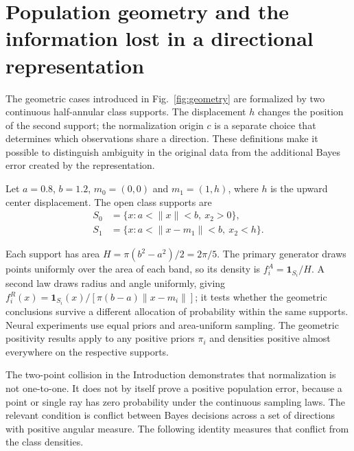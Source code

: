 \section{Population geometry and the information lost in a directional representation}
\label{sec:origin-theory}

The geometric cases introduced in Fig.~\ref{fig:geometry} are formalized by two continuous half-annular class supports. The displacement $h$ changes the position of the second support; the normalization origin $c$ is a separate choice that determines which observations share a direction. These definitions make it possible to distinguish ambiguity in the original data from the additional Bayes error created by the representation.

\begin{samepage}
Let $a=0.8$, $b=1.2$, $m_0=(0,0)$ and $m_1=(1,h)$, where $h$ is the upward center displacement. The open class supports are
\begin{align}
 S_0&=\{x:a<\|x\|<b,\ x_2>0\},\nonumber\\
 S_1&=\{x:a<\|x-m_1\|<b,\ x_2<h\}.
 \label{eq:halfmoon-supports}
\end{align}
\end{samepage}
Each support has area $H=\pi(b^2-a^2)/2=2\pi/5$. The primary generator draws points uniformly over the area of each band, so its density is $f_i^A=\mathbf1_{S_i}/H$. A second law draws radius and angle uniformly, giving $f_i^R(x)=\mathbf1_{S_i}(x)/[\pi(b-a)\|x-m_i\|]$; it tests whether the geometric conclusions survive a different allocation of probability within the same supports. Neural experiments use equal priors and area-uniform sampling. The geometric positivity results apply to any positive priors $\pi_i$ and densities positive almost everywhere on the respective supports.

The two-point collision in the Introduction demonstrates that normalization is not one-to-one. It does not by itself prove a positive population error, because a point or single ray has zero probability under the continuous sampling laws. The relevant condition is conflict between Bayes decisions across a set of directions with positive angular measure. The following identity measures that conflict from the class densities.

